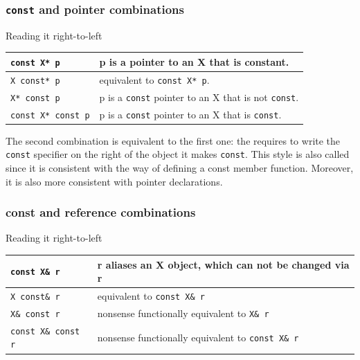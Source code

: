 \subsubsection{\texttt{const} and pointer combinations}
Reading it right-to-left
\begin{table}[h!t]
    \begin{tabularx}{\textwidth}{|l|X|}
        \hline
        \texttt{const X* p} & p is a pointer to an X that is constant.\\
        \hline
        \texttt{X const* p} & equivalent to \texttt{const X* p}.\\
        \hline
        \texttt{X* const p} & p is a \texttt{const} pointer to an X that 
                              is not \texttt{const}.\\
        \hline
        \texttt{const X* const p} &  p is a \texttt{const} pointer to an 
                                     X that is \texttt{const}.\\
        \hline
    \end{tabularx}
\end{table}

The second combination is equivalent to the first one: the 
 requires to write the 
\texttt{const} specifier on the right of the object it makes 
\texttt{const}. This style is also called  
since it is consistent with the way of defining a const member function. 
Moreover, it is also more consistent with pointer declarations.
\subsubsection{const and reference combinations}
Reading it right-to-left
\begin{table}[h!t]
    \begin{tabularx}{\textwidth}{|l|X|}
        \hline
        \texttt{const X\& r} & r aliases an X object, which can not be changed via r \\
        \hline
        \texttt{X const\& r} & equivalent to \texttt{const X\& r} \\
        \hline
        \texttt{X\& const r} & nonsense functionally equivalent to \texttt{X\& r}\\
        \hline
        \texttt{const X\& const r} & nonsense functionally equivalent to \texttt{const X\& r}\\       
        \hline
    \end{tabularx}
\end{table}

